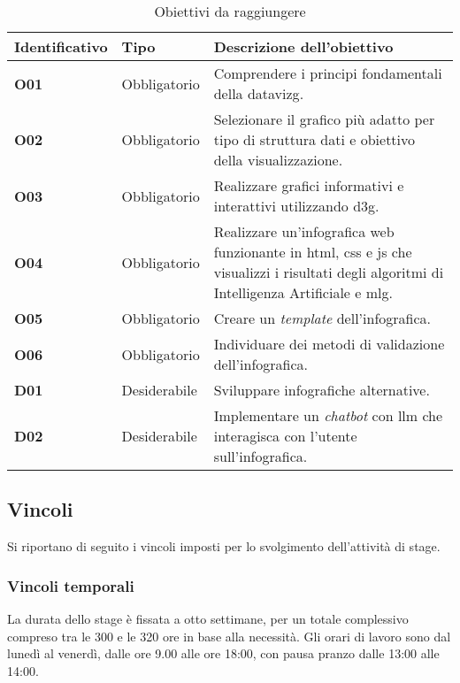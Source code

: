 \renewcommand{\arraystretch}{1.5}
\begin{table}[H]
    \centering
    \begin{tabular}{|>{\centering\arraybackslash} m{} |>{\centering\arraybackslash} m{} |>{\centering\arraybackslash} m{}|}
        \hline
        \rowcolor{gray!20}
        \textbf{Identificativo} & \textbf{Tipo} & \textbf{Descrizione dell'obiettivo} \\
        \hline
        \textbf{O01} & Obbligatorio & Comprendere i principi fondamentali della \gls{datavizg}. \\
        \hline
        \textbf{O02} & Obbligatorio & Selezionare il grafico più adatto per tipo di struttura dati e obiettivo della visualizzazione. \\
        \hline
        \textbf{O03} & Obbligatorio & Realizzare grafici informativi e interattivi utilizzando \gls{d3g}. \\
        \hline
        \textbf{O04} & Obbligatorio & Realizzare un'infografica web funzionante in \gls{html}, \gls{css} e \gls{js} che visualizzi i risultati degli algoritmi di Intelligenza Artificiale e \gls{mlg}. \\
        \hline
        \textbf{O05} & Obbligatorio & Creare un \emph{template} dell'infografica. \\
        \hline
        \textbf{O06} & Obbligatorio & Individuare dei metodi di validazione dell'infografica. \\
        \hline
        \textbf{D01} & Desiderabile & Sviluppare infografiche alternative. \\
        \hline
        \textbf{D02} & Desiderabile & Implementare un \emph{chatbot} con \gls{llm} che interagisca con l'utente sull'infografica. \\
        \hline
    \end{tabular}
    \vspace{0.2cm}
    \caption{Obiettivi da raggiungere}
    \label{tab:obiettivi}
\end{table}


\subsection{Vincoli}
Si riportano di seguito i vincoli imposti per lo svolgimento dell'attività di stage.

\subsubsection{Vincoli temporali}
La durata dello stage è fissata a otto settimane, per un totale complessivo compreso tra le 300 e le 320 ore in base alla necessità.
Gli orari di lavoro sono dal lunedì al venerdì, dalle ore 9.00 alle ore 18:00, con pausa pranzo dalle 13:00 alle 14:00.

